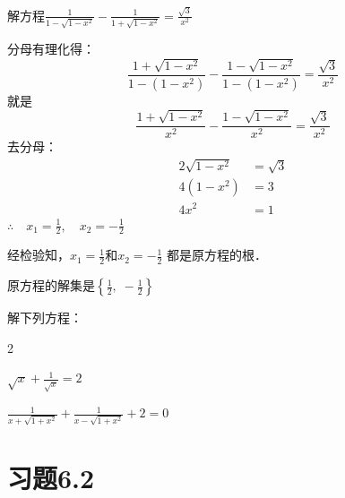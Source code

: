 \begin{example}
    解方程$\frac{1}{1-\sqrt{1-x^2}}-\frac{1}{1+\sqrt{1-x^2}}=\frac{\sqrt{3}}{x^2}$
\end{example}

\begin{solution}
    分母有理化得：
\[\frac{1+\sqrt{1-x^2}}{1-(1-x^2)}-\frac{1-\sqrt{1-x^2}}{1-(1-x^2)}=\frac{\sqrt{3}}{x^2}\]
就是
\[\frac{1+\sqrt{1-x^2}}{x^2}-\frac{1-\sqrt{1-x^2}}{x^2}=\frac{\sqrt{3}}{x^2}\]
去分母：
\[\begin{split}
    2\sqrt{1-x^2}&= \sqrt{3}\\
    4(1-x^2)&=3\\
    4x^2&=1
\end{split}\]
$\therefore\quad x_1=\frac{1}{2},\quad x_2=-\frac{1}{2}$

经检验知，$x_1=\frac{1}{2}$和$x_2=-\frac{1}{2}$
都是原方程的根．

原方程的解集是$\left\{\frac{1}{2},\; -\frac{1}{2}\right\}$
\end{solution}

\begin{ex}
    解下列方程：
\begin{enumerate}
    \begin{multicols}{2}
    \item $\sqrt{x}+\frac{1}{\sqrt{x}}=2$
    \item $\frac{1}{x+\sqrt{1+x^2}}+\frac{1}{x-\sqrt{1+x^2}}+2=0$
    \end{multicols} 
\end{enumerate}
\end{ex}



\section*{习题6.2}

